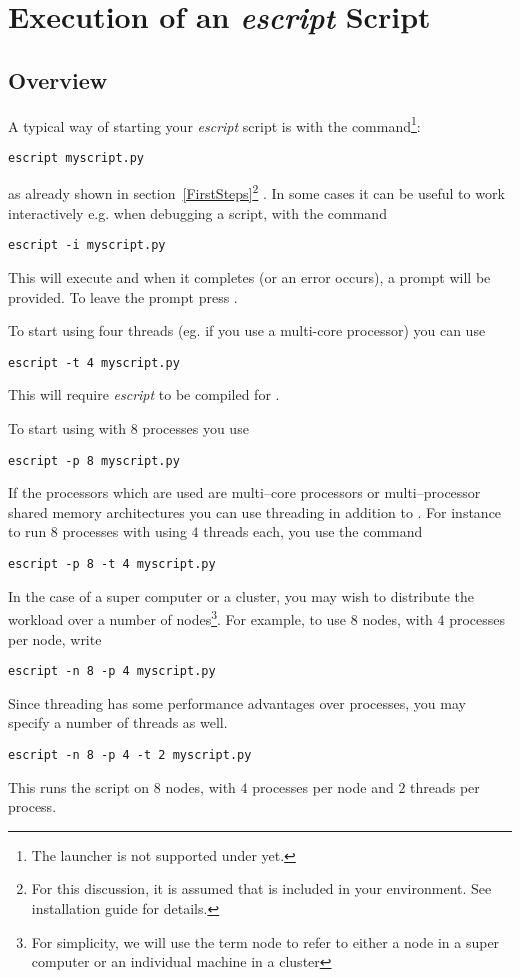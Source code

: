 \chapter{Execution of an {\it escript} Script}
\label{EXECUTION}

\section{Overview}
A typical way of starting your {\it escript} script  is with the  command\footnote{The  launcher is not supported under \WINDOWS yet.}:
\begin{verbatim}
escript myscript.py
\end{verbatim}
as already shown in section~\ref{FirstSteps}\footnote{For this discussion, it is assumed that  is included in your  environment. See installation guide for details.}
. In some cases 
it can be useful to work interactively e.g. when debugging a script, with the command 
\begin{verbatim}
escript -i myscript.py
\end{verbatim}
This will execute  and when it completes (or an error occurs), a \PYTHON prompt will be provided.
To leave the prompt press .

To start 
 using four threads (eg. if you use a multi-core processor) you can use
\begin{verbatim}
escript -t 4 myscript.py
\end{verbatim}
This will require {\it escript} to be compiled for \OPENMP\cite{OPENMP}. 

To start  using \MPI\cite{MPI} with $8$ processes you use
\begin{verbatim}
escript -p 8 myscript.py
\end{verbatim}
If the processors which are used are multi--core processors or multi--processor shared memory architectures you can use threading in addition to \MPI. For instance to run $8$ \MPI processes with using $4$ threads each, you use the command
\begin{verbatim}
escript -p 8 -t 4 myscript.py
\end{verbatim}
In the case of a super computer or a cluster, you may wish to distribute the workload over a number of nodes\footnote{For simplicity, we will use the term node to refer to either a node in a super computer or an individual machine in a cluster}.
For example, to use $8$ nodes, with $4$ \MPI processes per node, write
\begin{verbatim}
escript -n 8 -p 4 myscript.py
\end{verbatim}
Since threading has some performance advantages over processes, you may specify a number of threads as well.
\begin{verbatim}
escript -n 8 -p 4 -t 2 myscript.py
\end{verbatim}
This runs the script on $8$ nodes, with $4$ processes per node and $2$ threads per process.

